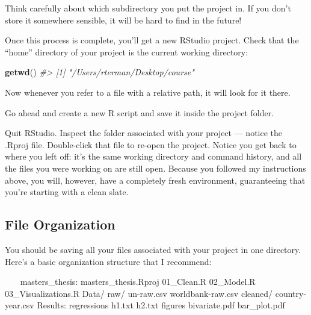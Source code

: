 \documentclass[]{book}
\newenvironment{Shaded}{\begin{snugshade}}{\end{snugshade}}
\newcommand{\BaseNTok}[1]{\textcolor[rgb]{0.00,0.00,0.81}{#1}}
\newcommand{\CommentTok}[1]{\textcolor[rgb]{0.56,0.35,0.01}{\textit{#1}}}
\newcommand{\KeywordTok}[1]{\textcolor[rgb]{0.13,0.29,0.53}{\textbf{#1}}}
\newcommand{\NormalTok}[1]{#1}
\begin{document}
Think carefully about which subdirectory you put the project in. If you don't store it somewhere sensible, it will be hard to find in the future!

Once this process is complete, you'll get a new RStudio project. Check that the ``home'' directory of your project is the current working directory:

\begin{Shaded}
\begin{Highlighting}[]
\KeywordTok{getwd}\NormalTok{()}
\CommentTok{#> [1] "/Users/rterman/Desktop/course"}
\end{Highlighting}
\end{Shaded}

Now whenever you refer to a file with a relative path, it will look for it there.

Go ahead and create a new R script and save it inside the project folder.

Quit RStudio. Inspect the folder associated with your project --- notice the .Rproj file. Double-click that file to re-open the project. Notice you get back to where you left off: it's the same working directory and command history, and all the files you were working on are still open. Because you followed my instructions above, you will, however, have a completely fresh environment, guaranteeing that you're starting with a clean slate.

\hypertarget{file-organization}{%
\subsection{File Organization}\label{file-organization}}

You should be saving all your files associated with your project in one directory. Here's a basic organization structure that I recommend:

\begin{Shaded}
\begin{Highlighting}[]
\NormalTok{~~~}
\NormalTok{masters_thesis:}
\NormalTok{  masters_thesis.Rproj}
\NormalTok{  01_Clean.R}
\NormalTok{  02_Model.R}
\NormalTok{  03_Visualizations.R}
\NormalTok{  Data/}
\BaseNTok{    raw/}
\BaseNTok{      un-raw.csv}
\BaseNTok{      worldbank-raw.csv}
\BaseNTok{    cleaned/}
\BaseNTok{      country-year.csv}
\NormalTok{  Results:}
\BaseNTok{    regressions}
\BaseNTok{      h1.txt}
\BaseNTok{      h2.txt}
\BaseNTok{    figures}
\BaseNTok{      bivariate.pdf}
\BaseNTok{      bar_plot.pdf}
\NormalTok{~~~}
\end{Highlighting}
\end{Shaded}
\end{document}
